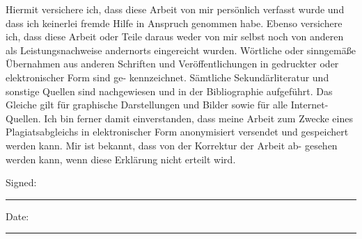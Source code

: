 \documentclass[
11pt, %
english, %
singlespacing, %
headsepline, %
]{MastersThesis} %
\theoremstyle{definition}
\theoremstyle{plain}
\theoremstyle{remark}
\theoremstyle{remark}
\begin{document}

\begin{declaration}
\addchaptertocentry{\authorshipname} %
Hiermit versichere ich, dass diese Arbeit von mir persönlich verfasst wurde und
dass ich keinerlei fremde Hilfe in Anspruch genommen habe. Ebenso versichere
ich, dass diese Arbeit oder Teile daraus weder von mir selbst noch von anderen
als Leistungsnachweise andernorts eingereicht wurden. Wörtliche oder sinngemäße
Übernahmen aus anderen Schriften und Veröffentlichungen in gedruckter oder
elektronischer Form sind ge- kennzeichnet. Sämtliche Sekundärliteratur und
sonstige Quellen sind nachgewiesen und in der Bibliographie aufgeführt. Das
Gleiche gilt für graphische Darstellungen und Bilder sowie für alle
Internet-Quellen. Ich bin ferner damit einverstanden, dass meine Arbeit zum
Zwecke eines Plagiatsabgleichs in elektronischer Form anonymisiert versendet und
gespeichert werden kann. Mir ist bekannt, dass von der Korrektur der Arbeit ab-
gesehen werden kann, wenn diese Erklärung nicht erteilt wird.
 
\noindent Signed:\\
\rule[0.5em]{25em}{0.5pt} %
 
\noindent Date:\\
\rule[0.5em]{25em}{0.5pt} %
\end{declaration}

\cleardoublepage





\end{document}
